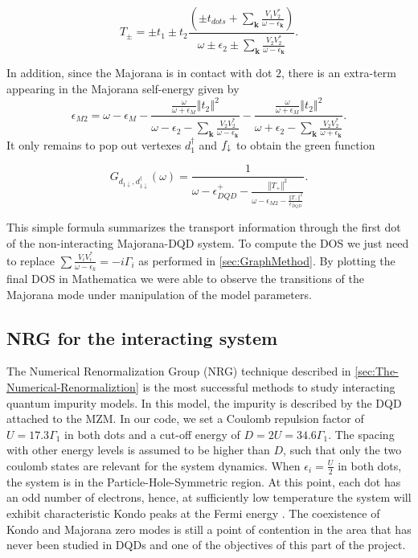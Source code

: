\begin{equation}
    T_{\pm}=\pm t_{1}\pm t_{2}\frac{\left(\pm t_{dots}+\sum_{\mathbf{k}}\frac{V_{1}V_{2}^{*}}{\omega-\epsilon_{\mathbf{k}}}\right)}{\omega\pm\epsilon_{2}\pm\sum_{\mathbf{k}}\frac{V_{2}V_{2}^{*}}{\omega-\epsilon_{\mathbf{k}}}}. \label{eq:T+-}
\end{equation}

\noindent In addition, since the Majorana is in contact with dot $2$, there is an extra-term appearing in the  Majorana self-energy given by 
\begin{equation}
    \epsilon_{M2}=\omega-\epsilon_{M}-\frac{\frac{\omega}{\omega+\epsilon_{M}}\left\Vert t_{2}\right\Vert ^{2} } {\omega-\epsilon_{2}-\sum_{\mathbf{k}}\frac{V_{2}V_{2}^{*}}{\omega-\epsilon_{\mathbf{k}}}}-\frac{\frac{\omega}{\omega+\epsilon_{M}}\left\Vert t_{2}\right\Vert ^{2}}{\omega+\epsilon_{2}-\sum_{\mathbf{k}}\frac{V_{2}V_{2}^{*}}{\omega+\epsilon_{\mathbf{k}}}}. \label{eq:M2}
\end{equation}
It only remains to pop out vertexes $d^\dagger_1$ and $f_\downarrow$  to obtain the green function 

\begin{equation}
    G_{{d_{1\downarrow},d_{1\downarrow}^{\dagger}}}\left(\omega\right)=\frac{1}{\omega-\epsilon_{DQD}^{+}-\frac{\left\Vert T_{+}\right\Vert ^{2}}{\omega-\epsilon_{M2}-\frac{\left\Vert T_{-}\right\Vert ^{2}}{\epsilon_{DQD}^{-}}}}.
    \label{eq:Green_NonInteracting}
\end{equation}

This simple formula summarizes the transport information through the first dot of the non-interacting Majorana-DQD system.  To compute the DOS we just need to replace  $\sum \frac{V_iV^*_i}{\omega -\epsilon_k}= -i\Gamma_i$ as performed in \ref{sec:GraphMethod}. By plotting the final DOS in Mathematica we were able to observe the transitions of the Majorana mode under manipulation of the model parameters.  


\subsection{NRG for the interacting system}

The Numerical Renormalization Group (NRG) technique described in \ref{sec:The-Numerical-Renormaliztion} is the most successful methods to study interacting quantum impurity models. In this model, the impurity is described by the DQD attached to the MZM. In our code, we set a Coulomb repulsion factor of $U =17.3\Gamma_1$ in both dots and a cut-off energy of $D=2U=34.6\Gamma_1$. The spacing with other energy levels is assumed to be higher than $D$, such that only the two coulomb states are relevant for the system dynamics.  When  $\epsilon_i = \frac{U}{2}$ in both dots, the system is in the Particle-Hole-Symmetric region. At this point, each dot has an odd number of electrons, hence, at sufficiently low temperature the system will exhibit characteristic Kondo peaks at the Fermi energy \cite{wilson_renormalization_1975}. The coexistence of Kondo and Majorana zero modes is still a point of contention in the area that has never been studied in DQDs and one of the objectives of this part of the project.


